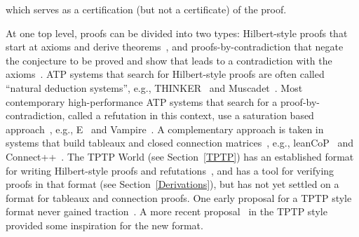 \documentclass[runningheads]{llncs}
\begin{document}
which serves as a certification (but not a certificate) of the proof.
%  

At one top level, proofs can be divided into two types: Hilbert-style proofs that start at
axioms and derive theorems~\cite{End72}, and proofs-by-contradiction that negate the
conjecture to be proved and show that leads to a contradiction with the axioms~\cite{Men87}.
ATP systems that search for Hilbert-style proofs are often called ``natural deduction systems'',
e.g., THINKER~\cite{Pel98} and Muscadet~\cite{Pas01-IJCAR}.
Most contemporary high-performance ATP systems that search for a proof-by-contradiction, called
a refutation in this context, use a saturation based approach~\cite{Sch06}, e.g., E~\cite{SCV19} 
and Vampire~\cite{KV13}.
A complementary approach is taken in systems that build tableaux and closed connection 
matrices~\cite{FB+98}, e.g., leanCoP~\cite{Ott23} and Connect++~\cite{Hol23}.
The TPTP World (see Section~\ref{TPTP}) has an established format for writing Hilbert-style proofs 
and refutations~\cite{SS+06}, and has a tool for verifying proofs in that format (see
Section~\ref{Derivations}), but has not yet settled on a format for tableaux and connection
proofs.
One early proposal for a TPTP style format never gained traction~\cite{OS10}.
A more recent proposal~\cite{OH23} in the TPTP style provided some inspiration for the new format.
\end{document}
